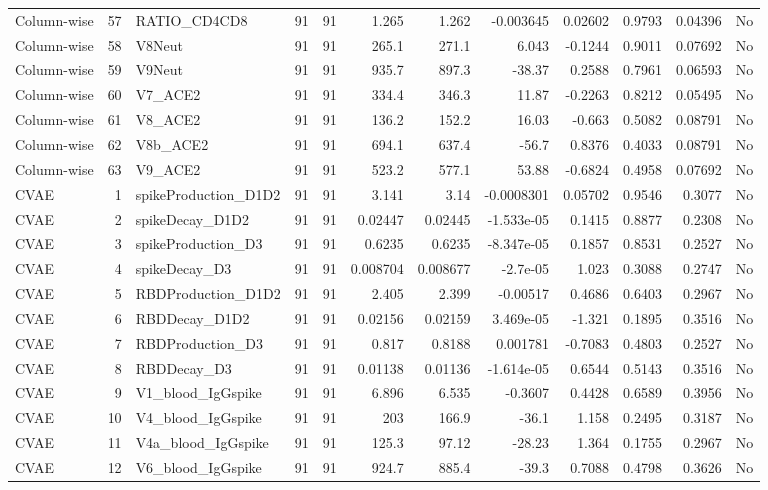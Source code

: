 \begin{longtable}{lrp{}rrrrrrrrl}
Column-wise & 57 & RATIO\_CD4CD8 & 91 & 91 & 1.265 & 1.262 & -0.003645 & 0.02602 & 0.9793 & 0.04396 & No \\
Column-wise & 58 & V8Neut & 91 & 91 & 265.1 & 271.1 & 6.043 & -0.1244 & 0.9011 & 0.07692 & No \\
Column-wise & 59 & V9Neut & 91 & 91 & 935.7 & 897.3 & -38.37 & 0.2588 & 0.7961 & 0.06593 & No \\
Column-wise & 60 & V7\_ACE2 & 91 & 91 & 334.4 & 346.3 & 11.87 & -0.2263 & 0.8212 & 0.05495 & No \\
Column-wise & 61 & V8\_ACE2 & 91 & 91 & 136.2 & 152.2 & 16.03 & -0.663 & 0.5082 & 0.08791 & No \\
Column-wise & 62 & V8b\_ACE2 & 91 & 91 & 694.1 & 637.4 & -56.7 & 0.8376 & 0.4033 & 0.08791 & No \\
Column-wise & 63 & V9\_ACE2 & 91 & 91 & 523.2 & 577.1 & 53.88 & -0.6824 & 0.4958 & 0.07692 & No \\
CVAE & 1 & spikeProduction\_D1D2 & 91 & 91 & 3.141 & 3.14 & -0.0008301 & 0.05702 & 0.9546 & 0.3077 & No \\
CVAE & 2 & spikeDecay\_D1D2 & 91 & 91 & 0.02447 & 0.02445 & -1.533e-05 & 0.1415 & 0.8877 & 0.2308 & No \\
CVAE & 3 & spikeProduction\_D3 & 91 & 91 & 0.6235 & 0.6235 & -8.347e-05 & 0.1857 & 0.8531 & 0.2527 & No \\
CVAE & 4 & spikeDecay\_D3 & 91 & 91 & 0.008704 & 0.008677 & -2.7e-05 & 1.023 & 0.3088 & 0.2747 & No \\
CVAE & 5 & RBDProduction\_D1D2 & 91 & 91 & 2.405 & 2.399 & -0.00517 & 0.4686 & 0.6403 & 0.2967 & No \\
CVAE & 6 & RBDDecay\_D1D2 & 91 & 91 & 0.02156 & 0.02159 & 3.469e-05 & -1.321 & 0.1895 & 0.3516 & No \\
CVAE & 7 & RBDProduction\_D3 & 91 & 91 & 0.817 & 0.8188 & 0.001781 & -0.7083 & 0.4803 & 0.2527 & No \\
CVAE & 8 & RBDDecay\_D3 & 91 & 91 & 0.01138 & 0.01136 & -1.614e-05 & 0.6544 & 0.5143 & 0.3516 & No \\
CVAE & 9 & V1\_blood\_IgGspike & 91 & 91 & 6.896 & 6.535 & -0.3607 & 0.4428 & 0.6589 & 0.3956 & No \\
CVAE & 10 & V4\_blood\_IgGspike & 91 & 91 & 203 & 166.9 & -36.1 & 1.158 & 0.2495 & 0.3187 & No \\
CVAE & 11 & V4a\_blood\_IgGspike & 91 & 91 & 125.3 & 97.12 & -28.23 & 1.364 & 0.1755 & 0.2967 & No \\
CVAE & 12 & V6\_blood\_IgGspike & 91 & 91 & 924.7 & 885.4 & -39.3 & 0.7088 & 0.4798 & 0.3626 & No \\

\end{longtable}
